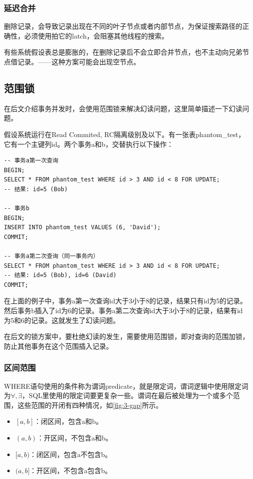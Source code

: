 \subsubsection*{延迟合并}

删除记录，会导致记录出现在不同的叶子节点或者内部节点，为保证搜索路径的正确性，必须使用拍它的latch，会阻塞其他线程的搜索。

有些系统假设表总是膨胀的，在删除记录后不会立即合并节点，也不主动向兄弟节点借记录。——这种方案可能会出现空节点。

\subsection{范围锁}

在后文介绍事务并发时，会使用范围锁来解决幻读问题，这里简单描述一下幻读问题。

假设系统运行在Read Commited, RC隔离级别及以下。有一张表phantom\_test，它有一个主键列id。两个事务a和b，交替执行以下操作：
\begin{lstlisting}[style=verbose]
-- 事务a第一次查询
BEGIN;
SELECT * FROM phantom_test WHERE id > 3 AND id < 8 FOR UPDATE;
-- 结果: id=5 (Bob)

-- 事务b
BEGIN;
INSERT INTO phantom_test VALUES (6, 'David');
COMMIT;

-- 事务a第二次查询（同一事务内）
SELECT * FROM phantom_test WHERE id > 3 AND id < 8 FOR UPDATE;
-- 结果: id=5 (Bob), id=6 (David)
COMMIT;
\end{lstlisting}

在上面的例子中，事务a第一次查询id大于3小于8的记录，结果只有id为5的记录。然后事务b插入了id为6的记录。事务a第二次查询id大于3小于8的记录，结果有id为5和6的记录。这就发生了幻读问题。

在后文的锁方案中，要杜绝幻读的发生，需要使用范围锁，即对查询的范围加锁，防止其他事务在这个范围插入记录。

\subsubsection*{区间范围}

WHERE语句使用的条件称为谓词predicate，就是限定词，谓词逻辑中使用限定词为$\forall, \exists$，SQL里使用的限定词要更复杂一些。谓词在最后被处理为一个或多个范围，这些范围的开闭有四种情况，如\figurename\ref{fig:3-gap}所示。

\begin{itemize}
    \item $[a, b]$：闭区间，包含a和b。
    \item $(a, b)$：开区间，不包含a和b。
    \item $[a, b)$：闭区间，包含a不包含b。
    \item $(a, b]$：开区间，不包含a包含b。
\end{itemize}

